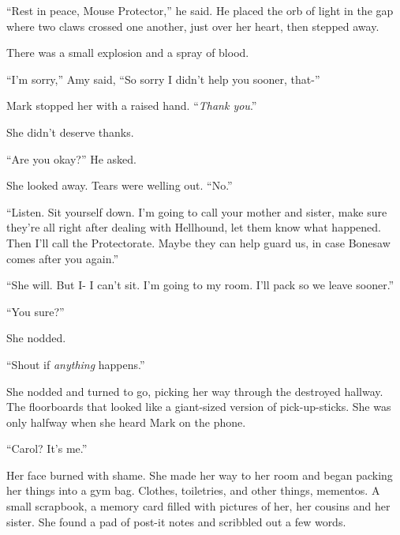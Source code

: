 ``Rest in peace, Mouse Protector,'' he said.  He placed the orb of light in the gap where two claws crossed one another, just over her heart, then stepped away.



There was a small explosion and a spray of blood.



``I'm sorry,'' Amy said, ``So sorry I didn't help you sooner, that-''



Mark stopped her with a raised hand.  ``\emph{Thank you}.''



She didn't deserve thanks.



``Are you okay?'' He asked.



She looked away.  Tears were welling out.  ``No.''



``Listen.  Sit yourself down.  I'm going to call your mother and sister, make sure they're all right after dealing with Hellhound, let them know what happened.  Then I'll call the Protectorate.  Maybe they can help guard us, in case Bonesaw comes after you again.''



``She will.  But I- I can't sit.  I'm going to my room.  I'll pack so we leave sooner.''



``You sure?''



She nodded.



``Shout if \emph{anything} happens.''



She nodded and turned to go, picking her way through the destroyed hallway.  The floorboards that looked like a giant-sized version of pick-up-sticks.  She was only halfway when she heard Mark on the phone.



``Carol?  It's me.''



Her face burned with shame.  She made her way to her room and began packing her things into a gym bag.  Clothes, toiletries, and other things, mementos.  A small scrapbook, a memory card filled with pictures of her, her cousins and her sister.  She found a pad of post-it notes and scribbled out a few words.



